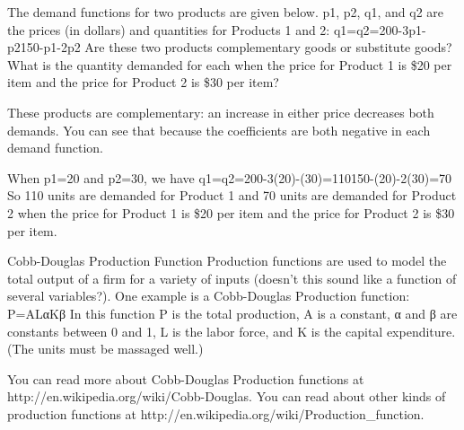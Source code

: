 \begin{example}
The demand functions for two products are given below. p1, p2, q1, and q2 are the prices (in dollars) and quantities for Products 1 and 2:
q1=q2=200-3p1-p2150-p1-2p2
Are these two products complementary goods or substitute goods? What is the quantity demanded for each when the price for Product 1 is \$20 per item and the price for Product 2 is \$30 per item?

\begin{solution} These products are complementary: an increase in either price decreases both demands. You can see that because the coefficients are both negative in each demand function.

When p1=20 and p2=30, we have
q1=q2=200-3(20)-(30)=110150-(20)-2(30)=70
So 110 units are demanded for Product 1 and 70 units are demanded for Product 2 when the price for Product 1 is \$20 per item and the price for Product 2 is \$30 per item.
\end{solution}\end{example}

Cobb-Douglas Production Function
Production functions are used to model the total output of a firm for a variety of inputs (doesn't this sound like a function of several variables?). One example is a Cobb-Douglas Production function:
P=ALαKβ
In this function P is the total production, A is a constant, α and β are constants between 0 and 1, L is the labor force, and K is the capital expenditure. (The units must be massaged well.)

You can read more about Cobb-Douglas Production functions at http://en.wikipedia.org/wiki/Cobb-Douglas. You can read about other kinds of production functions at http://en.wikipedia.org/wiki/Production_function.
